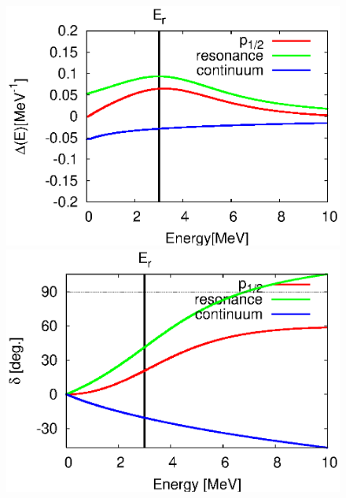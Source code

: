 \documentclass[english,a4paper]{jsarticle}
\begin{document}
\begin{figure}
  \begin{minipage}{0.5\textwidth}
    \begin{flushright}
      \includegraphics[width=1.0\textwidth,clip]{../cld/decompose/deco_cld_p1.eps}
    \end{flushright}
  \end{minipage}
  \begin{minipage}{0.5\textwidth}
    \begin{flushright}
      \includegraphics[width=1.0\textwidth,clip]{../phs/decompose/deco_phs_p1.eps}
    \end{flushright}
  \end{minipage}
\end{figure}
\end{document}
